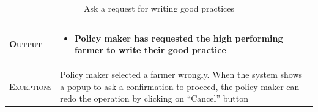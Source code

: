 \begin{table}[H]
\begin{tabular}{|l|p{}|}
    	\hline %
    	\textsc{Output}             &  \begin{itemize}
    	    \item Policy maker has requested the high performing farmer to write their good practice
    	\end{itemize}\\
    	\hline %
    	\textsc{Exceptions}         &  Policy maker selected a farmer wrongly. When the 
    	system shows a popup to ask a confirmation to proceed, the policy maker can redo the operation by clicking on “Cancel” button\\
    	\hline %
        
    \end{tabular}
    \caption{\label{tab:visualize_iprovement}Ask a request for writing good practices} %
\end{table}